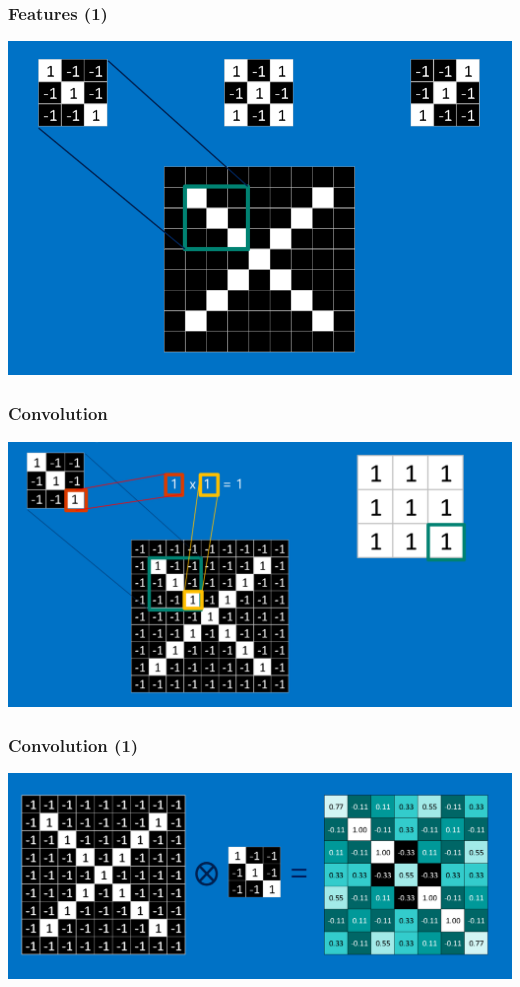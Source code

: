 \documentclass[11pt]{article}
\begin{document}
\subsubsection*{Features (1)}
\label{sec:org733af8f}
\begin{center}
\begin{center}
\includegraphics[width=.9\linewidth]{images/features_2.png}
\end{center}
\end{center}
\subsubsection*{Convolution}
\label{sec:orga45e5dd}
\begin{center}
\begin{center}
\includegraphics[width=.9\linewidth]{images/convolution.png}
\end{center}
\end{center}
\subsubsection*{Convolution (1)}
\label{sec:orgdb5e41d}
\begin{center}
\begin{center}
\includegraphics[width=.9\linewidth]{images/convolution_2.png}
\end{center}
\end{center}
\end{document}
